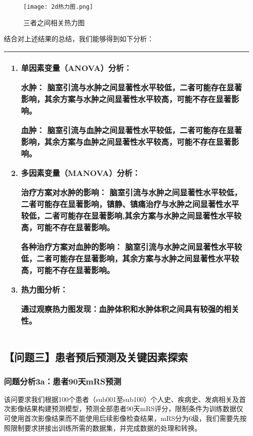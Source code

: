 \documentclass[bwprint]{gmcmthesis}
\begin{document}
					\begin{figure}[H]
					\centering
					\caption{三者之间相关热力图}
					\texttt{[image: 2d热力图.png]}
					\label{fig:13}
				\end{figure}
				
				结合对上述结果的总结，我们能够得到如下分析：
				
				\begin{table}[H]
					\centering
					\begin{tabularx}{\textwidth}{|X|}
						\hline
						\begin{enumerate}
							\item 单因素变量（ANOVA）分析：
							
							水肿：
							脑室引流与水肿之间显著性水平较低，二者可能存在显著影响，其余方案与水肿之间显著性水平较高，可能不存在显著影响。
							
							血肿：
							脑室引流与血肿之间显著性水平较低，二者可能存在显著影响，其余方案与血肿之间显著性水平较高，可能不存在显著影响。
							
							\item 多因素变量（MANOVA）分析：
							
							治疗方案对水肿的影响：
							脑室引流与水肿之间显著性水平较低，二者可能存在显著影响，镇静、镇痛治疗与水肿之间显著性水平较低，二者可能存在显著影响,其余方案与水肿之间显著性水平较高，可能不存在显著影响。
							
							各种治疗方案对血肿的影响：
							脑室引流与水肿之间显著性水平较低，二者可能存在显著影响，其余方案与水肿之间显著性水平较高，可能不存在显著影响。
							\item 热力图分析：
							
							通过观察热力图发现：血肿体积和水肿体积之间具有较强的相关性。
							
						\end{enumerate}\\
						\hline
					\end{tabularx}
				\end{table}
		
		\subsection{【问题三】患者预后预测及关键因素探索}
			\subsubsection{问题分析3a：患者90天mRS预测}
				该问要求我们根据100个患者（sub001至sub100）个人史、疾病史、发病相关及首次影像结果构建预测模型，预测全部患者90天mRS评分，限制条件为训练数据仅可使用首次影像结果而不能使用后续影像检查结果，mRS分为6级，我们需要先按照限制要求拼接出训练所需的数据集，并完成数据的处理和转换。
				
\end{document}
